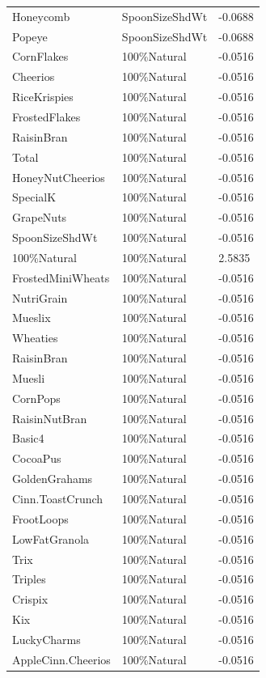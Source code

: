 \begin{table}[!htbp]
\begin{tabular}{lll}
Honeycomb & SpoonSizeShdWt & -0.0688
\\
Popeye & SpoonSizeShdWt & -0.0688
\\
CornFlakes & 100\%Natural & -0.0516
\\
Cheerios & 100\%Natural & -0.0516
\\
RiceKrispies & 100\%Natural & -0.0516
\\
FrostedFlakes & 100\%Natural & -0.0516
\\
RaisinBran & 100\%Natural & -0.0516
\\
Total & 100\%Natural & -0.0516
\\
HoneyNutCheerios & 100\%Natural & -0.0516
\\
SpecialK & 100\%Natural & -0.0516
\\
GrapeNuts & 100\%Natural & -0.0516
\\
SpoonSizeShdWt & 100\%Natural & -0.0516
\\
100\%Natural & 100\%Natural & 2.5835
\\
FrostedMiniWheats & 100\%Natural & -0.0516
\\
NutriGrain & 100\%Natural & -0.0516
\\
Mueslix & 100\%Natural & -0.0516
\\
Wheaties & 100\%Natural & -0.0516
\\
RaisinBran & 100\%Natural & -0.0516
\\
Muesli & 100\%Natural & -0.0516
\\
CornPops & 100\%Natural & -0.0516
\\
RaisinNutBran & 100\%Natural & -0.0516
\\
Basic4 & 100\%Natural & -0.0516
\\
CocoaPus & 100\%Natural & -0.0516
\\
GoldenGrahams & 100\%Natural & -0.0516
\\
Cinn.ToastCrunch & 100\%Natural & -0.0516
\\
FrootLoops & 100\%Natural & -0.0516
\\
LowFatGranola & 100\%Natural & -0.0516
\\
Trix & 100\%Natural & -0.0516
\\
Triples & 100\%Natural & -0.0516
\\
Crispix & 100\%Natural & -0.0516
\\
Kix & 100\%Natural & -0.0516
\\
LuckyCharms & 100\%Natural & -0.0516
\\
AppleCinn.Cheerios & 100\%Natural & -0.0516
\\

\end{tabular}
\end{table}
